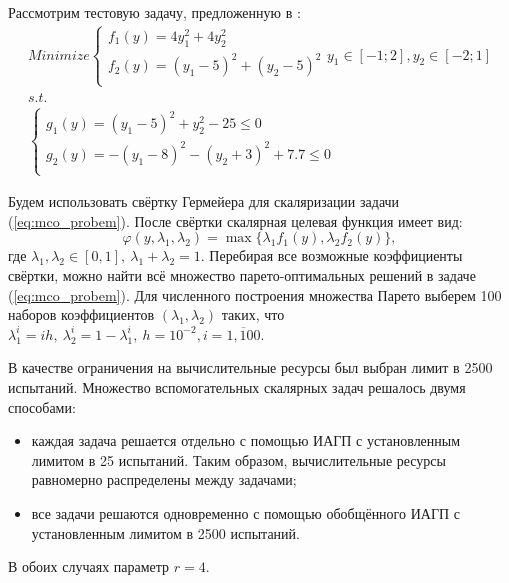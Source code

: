 \documentclass[11pt, oneside, a4paper]{article}
\begin{document}
Рассмотрим тестовую задачу, предложенную в \cite{BinhKorn1999}:
\begin{equation}
  \label{eq:mco_probem}
  \begin{array}{l}
      Minimize \left \{
      \begin{array}{l}
        f_1(y) = 4 y_1^2 + 4 y_2^2 \\
        f_2(y) = (y_1-5)^2 + (y_2-5)^2 \\
      \end{array}
      \right .
      y_1\in [-1;2],y_2\in [-2;1]
      \\s.t.
      \\
      \left \{
      \begin{array}{l}
        g_1(y) = (y_1 - 5)^2 + y_2^2 - 25 \leqslant 0 \\
        g_2(y) = -(y_1 - 8)^2 - (y_2 + 3)^2 + 7.7 \leqslant 0\\
      \end{array}
      \right .
  \end{array}
\end{equation}

Будем использовать свёртку Гермейера для скаляризации задачи (\ref{eq:mco_probem}).
После свёртки скалярная целевая функция имеет вид:
\begin{equation}
  \varphi(y,\lambda_1,\lambda_2)=\max\{\lambda_1 f_1(y), \lambda_2 f_2(y)\},
\end{equation}
где \(\lambda_1,\lambda_2\in[0,1],\: \lambda_1+\lambda_2=1\). Перебирая все возможные
коэффициенты свёртки, можно найти всё множество парето-оптимальных решений в
задаче (\ref{eq:mco_probem}). Для численного построения множества Парето выберем
100 наборов коэффициентов \((\lambda_1,\lambda_2)\) таких, что
\(\lambda_1^i=i h,\: \lambda_2^i=1-\lambda_1^i,\: h=10^{-2},i=\overline{1, 100}\).

В качестве ограничения на вычислительные ресурсы был выбран лимит в 2500 испытаний.
Множество вспомогательных скалярных задач решалось двумя способами:
\begin{itemize}
  \item каждая задача решается отдельно с помощью ИАГП с установленным лимитом в
  25 испытаний. Таким образом, вычислительные ресурсы равномерно распределены между задачами;
  \item все задачи решаются одновременно с помощью обобщённого ИАГП с установленным лимитом в
  2500 испытаний.
\end{itemize}
В обоих случаях параметр \(r=4\).
\end{document}
